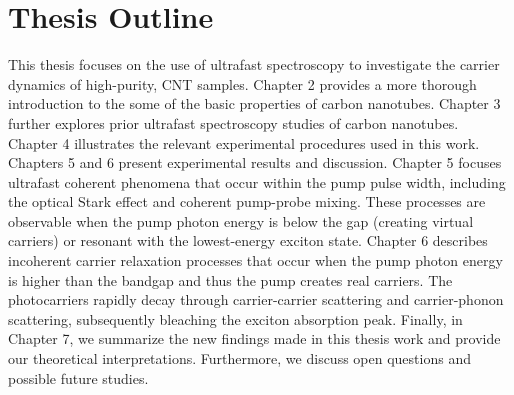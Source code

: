 \section{Thesis Outline}

This thesis focuses on the use of ultrafast spectroscopy to investigate the carrier dynamics of high-purity, CNT samples. Chapter 2 provides a more thorough introduction to the some of the basic properties of carbon nanotubes. Chapter 3 further explores prior ultrafast spectroscopy studies of carbon nanotubes. Chapter 4 illustrates the relevant experimental procedures used in this work. Chapters 5 and 6 present experimental results and discussion.  Chapter 5 focuses ultrafast coherent phenomena that occur within the pump pulse width, including the optical Stark effect and coherent pump-probe mixing.  These processes are observable when the pump photon energy is below the gap (creating virtual carriers) or resonant with the lowest-energy exciton state.  Chapter 6 describes incoherent carrier relaxation processes that occur when the pump photon energy is higher than the bandgap and thus the pump creates real carriers. The photocarriers rapidly decay through carrier-carrier scattering and carrier-phonon scattering, subsequently bleaching the exciton absorption peak.  Finally, in Chapter 7, we summarize the new findings made in this thesis work and provide our theoretical interpretations.  Furthermore, we discuss open questions and possible future studies.
